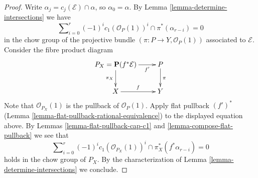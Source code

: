 \documentclass[10pt,a4paper]{amsart}
\theoremstyle{plain}
\theoremstyle{definition}
\theoremstyle{remark}
\numberwithin{equation}{subsection}
\begin{document}
\begin{proof}
Write $\alpha_j = c_j(\mathcal{E}) \cap \alpha$, so $\alpha_0 = \alpha$.
By Lemma \ref{lemma-determine-intersections} we have
$$
\sum\nolimits_{i = 0}^r
(-1)^i c_1(\mathcal{O}_P(1))^i \cap
\pi^*(\alpha_{r - i}) = 0
$$
in the chow group of the projective bundle
$(\pi : P \to Y, \mathcal{O}_P(1))$
associated to $\mathcal{E}$. Consider the fibre product diagram
$$
\xymatrix{
P_X = \mathbf{P}(f^*\mathcal{E}) \ar[r]_-{f'} \ar[d]_{\pi_X} &
P \ar[d]^\pi \\
X \ar[r]^f & Y
}
$$
Note that $\mathcal{O}_{P_X}(1)$ is the pullback of $\mathcal{O}_P(1)$.
Apply flat pullback $(f')^*$
(Lemma \ref{lemma-flat-pullback-rational-equivalence}) to the displayed
equation above. By Lemmas \ref{lemma-flat-pullback-cap-c1} and
\ref{lemma-compose-flat-pullback} we see that
$$
\sum\nolimits_{i = 0}^r
(-1)^i c_1(\mathcal{O}_{P_X}(1))^i \cap
\pi_X^*(f^*\alpha_{r - i}) = 0
$$
holds in the chow group of $P_X$. By the characterization of
Lemma \ref{lemma-determine-intersections} we conclude.
\end{proof}
\end{document}
